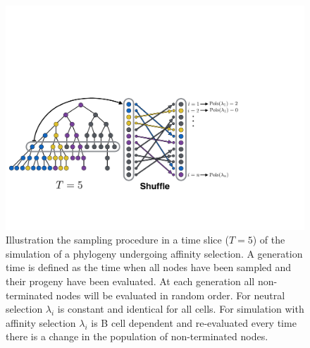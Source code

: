 \begin{figure}
    \centering
    \includegraphics[width=1\textwidth]{figures/tree_iteration.pdf}
    \caption{
        \label{fig:tree_iteration}
        Illustration the sampling procedure in a time slice ($T=5$) of the simulation of a phylogeny undergoing affinity selection.
        A generation time is defined as the time when all nodes have been sampled and their progeny have been evaluated.
        At each generation all non-terminated nodes will be evaluated in random order.
        For neutral selection $\lambda_i$ is constant and identical for all cells.
        For simulation with affinity selection $\lambda_i$ is B cell dependent and re-evaluated every time there is a change in the population of non-terminated nodes.
    }
\end{figure}


